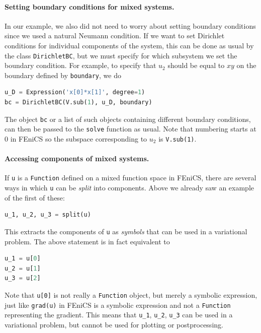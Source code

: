 \documentclass[graybox,envcountchap,sectrefs,final]{svmonodo}
\begin{document}
\paragraph{Setting boundary conditions for mixed systems.}
In our example, we also did not need to worry about setting boundary
conditions since we used a natural Neumann condition. If we want to set
Dirichlet conditions for individual components of the system, this can
be done as usual by the class \texttt{DirichletBC}, but we must specify for
which subsystem we set the boundary condition. For example, to specify
that $u_2$ should be equal to $xy$ on the boundary defined by
\texttt{boundary}, we do

\begin{lstlisting}[language=Python,style=graycolor]
u_D = Expression('x[0]*x[1]', degree=1)
bc = DirichletBC(V.sub(1), u_D, boundary)
\end{lstlisting}
The object \texttt{bc} or a list of such objects containing different
boundary conditions, can then be passed to the \texttt{solve} function as usual.
Note that numbering starts at $0$ in FEniCS so the subspace
corresponding to $u_2$ is \texttt{V.sub(1)}.

\paragraph{Accessing components of mixed systems.}

If \texttt{u} is a \texttt{Function} defined on a mixed function space in FEniCS,
there are several ways in which \texttt{u} can be \emph{split} into components.
Above we already saw an example of the first of these:

\begin{lstlisting}[language=Python,style=graycolor]
u_1, u_2, u_3 = split(u)
\end{lstlisting}
This extracts the components of \texttt{u} as \emph{symbols} that can be used in a
variational problem. The above statement is in fact equivalent to

\begin{lstlisting}[language=Python,style=graycolor]
u_1 = u[0]
u_2 = u[1]
u_3 = u[2]
\end{lstlisting}
Note that \texttt{u[0]} is not really a \texttt{Function} object, but merely a
symbolic expression, just like \texttt{grad(u)} in FEniCS is a symbolic
expression and not a \texttt{Function} representing the gradient.  This means
that \Verb!u_1!, \Verb!u_2!, \Verb!u_3! can be used in a variational problem, but
cannot be used for plotting or postprocessing.
\end{document}
